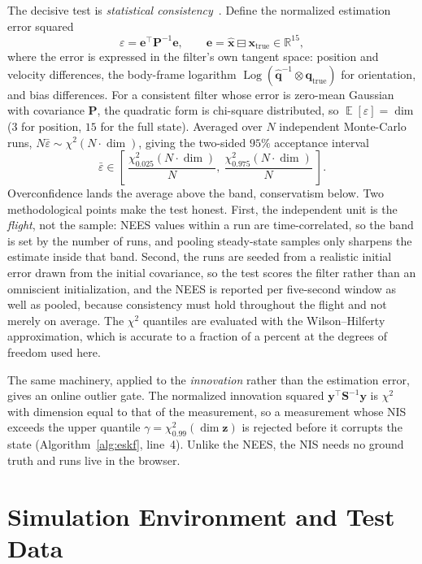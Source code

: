 \documentclass[11pt]{article}
\newcommand{\bq}{\mathbf{q}}
\newcommand{\bP}{\mathbf{P}}
\newcommand{\bz}{\mathbf{z}}
\newcommand{\bx}{\mathbf{x}}
\newcommand{\bS}{\mathbf{S}}
\newcommand{\real}{\mathbb{R}}
\DeclareMathOperator{\Log}{Log}
\DeclareMathOperator{\Ex}{\mathbb{E}}
\begin{document}
The decisive test is \emph{statistical consistency}~\cite{barshalom2001}. Define the normalized
estimation error squared
\begin{equation}
  \varepsilon = \bm{e}^{\top}\bP^{-1}\bm{e}, \qquad
  \bm{e} = \hat{\bx}\boxminus\bx_{\text{true}} \in \real^{15},
\end{equation}
where the error is expressed in the filter's own tangent space: position and velocity differences, the
body-frame logarithm $\Log(\hat{\bq}^{-1}\!\otimes\bq_{\text{true}})$ for orientation, and bias
differences. For a consistent filter whose error is zero-mean Gaussian with covariance $\bP$, the
quadratic form is chi-square distributed, so $\Ex[\varepsilon]=\dim$ ($3$ for position, $15$ for the
full state). Averaged over $N$ independent Monte-Carlo runs, $N\bar\varepsilon \sim \chi^2(N\cdot\dim)$,
giving the two-sided $95\%$ acceptance interval
\begin{equation}
  \bar\varepsilon \in
  \left[\ \frac{\chi^2_{0.025}(N\cdot\dim)}{N},\ \frac{\chi^2_{0.975}(N\cdot\dim)}{N}\ \right].
  \label{eq:neesband}
\end{equation}
Overconfidence lands the average above the band, conservatism below. Two methodological points make the
test honest. First, the independent unit is the \emph{flight}, not the sample: NEES values within a run
are time-correlated, so the band is set by the number of runs, and pooling steady-state samples only
sharpens the estimate inside that band. Second, the runs are seeded from a realistic initial error drawn
from the initial covariance, so the test scores the filter rather than an omniscient initialization, and
the NEES is reported per five-second window as well as pooled, because consistency must hold throughout
the flight and not merely on average. The $\chi^2$ quantiles are evaluated with the Wilson--Hilferty
approximation, which is accurate to a fraction of a percent at the degrees of freedom used here.

The same machinery, applied to the \emph{innovation} rather than the estimation error, gives an online
outlier gate. The normalized innovation squared $\bm y^{\!\top}\bS^{-1}\bm y$ is $\chi^2$ with dimension
equal to that of the measurement, so a measurement whose NIS exceeds the upper quantile
$\gamma=\chi^2_{0.99}(\dim\bz)$ is rejected before it corrupts the state (Algorithm~\ref{alg:eskf},
line~4). Unlike the NEES, the NIS needs no ground truth and runs live in the browser.

\section{Simulation Environment and Test Data}
\label{sec:sim}
\end{document}
